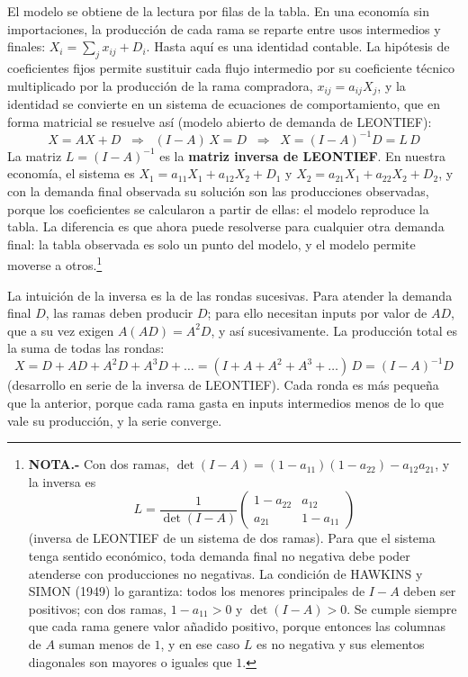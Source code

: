 \documentclass[10pt,a4paper]{article}
\begin{document}
El modelo se obtiene de la lectura por filas de la tabla. En una economía sin importaciones, la producción de cada rama se reparte entre usos intermedios y finales: $X_i=\sum_j x_{ij}+D_i$. Hasta aquí es una identidad contable. La hipótesis de coeficientes fijos permite sustituir cada flujo intermedio por su coeficiente técnico multiplicado por la producción de la rama compradora, $x_{ij}=a_{ij}X_j$, y la identidad se convierte en un sistema de ecuaciones de comportamiento, que en forma matricial se resuelve así (modelo abierto de demanda de LEONTIEF):
$$X=AX+D\;\;\Longrightarrow\;\;(I-A)\,X=D\;\;\Longrightarrow\;\;X=(I-A)^{-1}D=L\,D$$
La matriz $L=(I-A)^{-1}$ es la \textbf{matriz inversa de LEONTIEF}. En nuestra economía, el sistema es $X_1=a_{11}X_1+a_{12}X_2+D_1$ y $X_2=a_{21}X_1+a_{22}X_2+D_2$, y con la demanda final observada su solución son las producciones observadas, porque los coeficientes se calcularon a partir de ellas: el modelo reproduce la tabla. La diferencia es que ahora puede resolverse para cualquier otra demanda final: la tabla observada es solo un punto del modelo, y el modelo permite moverse a otros.\footnote{%
    \textbf{NOTA.-} Con dos ramas, $\det(I-A)=(1-a_{11})(1-a_{22})-a_{12}a_{21}$, y la inversa es
    $$L=\frac{1}{\det(I-A)}\begin{pmatrix}1-a_{22} & a_{12}\\ a_{21} & 1-a_{11}\end{pmatrix}$$
    (inversa de LEONTIEF de un sistema de dos ramas). Para que el sistema tenga sentido económico, toda demanda final no negativa debe poder atenderse con producciones no negativas. La condición de HAWKINS y SIMON (1949) lo garantiza: todos los menores principales de $I-A$ deben ser positivos; con dos ramas, $1-a_{11}>0$ y $\det(I-A)>0$. Se cumple siempre que cada rama genere valor añadido positivo, porque entonces las columnas de $A$ suman menos de $1$, y en ese caso $L$ es no negativa y sus elementos diagonales son mayores o iguales que $1$.
}

La intuición de la inversa es la de las rondas sucesivas. Para atender la demanda final $D$, las ramas deben producir $D$; para ello necesitan inputs por valor de $AD$, que a su vez exigen $A(AD)=A^2D$, y así sucesivamente. La producción total es la suma de todas las rondas:
$$X=D+AD+A^2D+A^3D+\dots=(I+A+A^2+A^3+\dots)\,D=(I-A)^{-1}D$$
(desarrollo en serie de la inversa de LEONTIEF). Cada ronda es más pequeña que la anterior, porque cada rama gasta en inputs intermedios menos de lo que vale su producción, y la serie converge.
\end{document}
